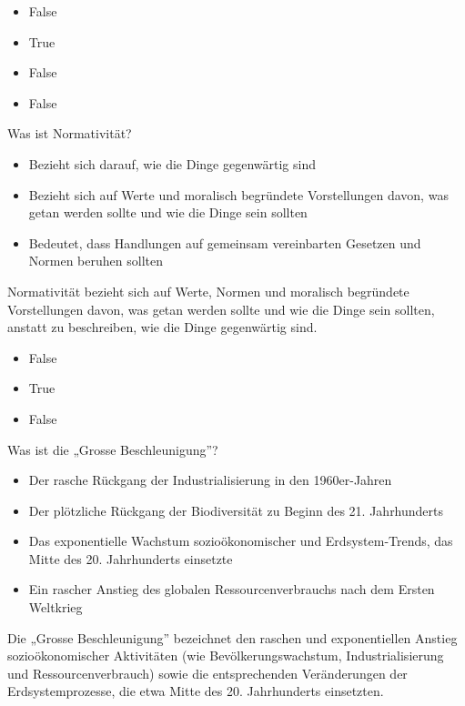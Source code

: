 \documentclass[
  nswissgerman,
  a4paper,
  openany]{book}
\providecommand{\tightlist}{%
  \setlength{\itemsep}{0pt}\setlength{\parskip}{0pt}}
\begin{document}
\begin{itemize}
\tightlist
\item
  False
\item
  True
\item
  False
\item
  False
\end{itemize}

Was ist Normativität?

\begin{itemize}
\tightlist
\item[$\square$]
  Bezieht sich darauf, wie die Dinge gegenwärtig sind
\item[$\square$]
  Bezieht sich auf Werte und moralisch begründete Vorstellungen davon,
  was getan werden sollte und wie die Dinge sein sollten
\item[$\square$]
  Bedeutet, dass Handlungen auf gemeinsam vereinbarten Gesetzen und
  Normen beruhen sollten
\end{itemize}

Normativität bezieht sich auf Werte, Normen und moralisch begründete
Vorstellungen davon, was getan werden sollte und wie die Dinge sein
sollten, anstatt zu beschreiben, wie die Dinge gegenwärtig sind.

\begin{itemize}
\tightlist
\item
  False
\item
  True
\item
  False
\end{itemize}

Was ist die „Grosse Beschleunigung''?

\begin{itemize}
\tightlist
\item[$\square$]
  Der rasche Rückgang der Industrialisierung in den 1960er-Jahren
\item[$\square$]
  Der plötzliche Rückgang der Biodiversität zu Beginn des 21.
  Jahrhunderts
\item[$\square$]
  Das exponentielle Wachstum sozioökonomischer und Erdsystem-Trends, das
  Mitte des 20. Jahrhunderts einsetzte
\item[$\square$]
  Ein rascher Anstieg des globalen Ressourcenverbrauchs nach dem Ersten
  Weltkrieg
\end{itemize}

Die „Grosse Beschleunigung'' bezeichnet den raschen und exponentiellen
Anstieg sozioökonomischer Aktivitäten (wie Bevölkerungswachstum,
Industrialisierung und Ressourcenverbrauch) sowie die entsprechenden
Veränderungen der Erdsystemprozesse, die etwa Mitte des 20. Jahrhunderts
einsetzten.
\end{document}
